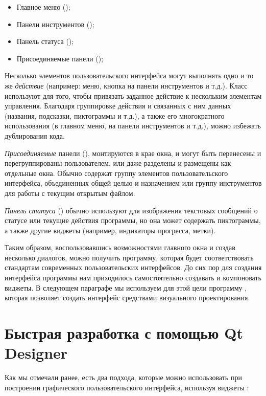 \begin{itemize}
\item Главное меню ();
\item Панели инструментов ();
\item Панель статуса ();
\item Присоединяемые панели ();
\end{itemize}
Несколько элементов пользовательского интерфейса могут выполнять одно и то же \emph{действие} (например: меню,
кнопка на панели инструментов и т.д.). Класс  используют для того, чтобы
привязать заданное действие к нескольким элементам управления. Благодаря группировке действия и связанных с ним данных
(названия, подсказки, пиктограммы и т.д.), а также его многократного использования (в главном меню, на панели
инструментов и т.д.), можно избежать дублирования кода.

\emph{Присоединяемые} панели 
(), монтируются в крае окна, и могут быть перенесены и перегруппированы
пользователем, или даже разделены и размещены как отдельные окна. Обычно содержат группу элементов пользовательского
интерфейса, объединенных общей целью и назначением или группу инструментов для работы с текущим открытым файлом.

\emph{Панель статуса} 
() обычно используют для изображения текстовых сообщений о статусе или текущие
действия программы, но она может содержать пиктограммы, а также другие виджеты (например, индикаторы прогресса, метки).

Таким образом, воспользовавшись возможностями главного окна и создав несколько диалогов, можно получить программу,
которая будет соответствовать стандартам современных пользовательских интерфейсов. До сих пор для создания интерфейса
программы нам приходилось самостоятельно создавать и компоновать виджеты. В следующем параграфе мы используем для этой
цели программу , которая позволяет создать интерфейс средствами визуального проектирования.

\section[Быстрая разработка с помощью Qt Designer]{Быстрая разработка с помощью Qt Designer}
Как мы отмечали ранее, есть два подхода, которые можно использовать при построении графического пользовательского
интерфейса, используя виджеты :

